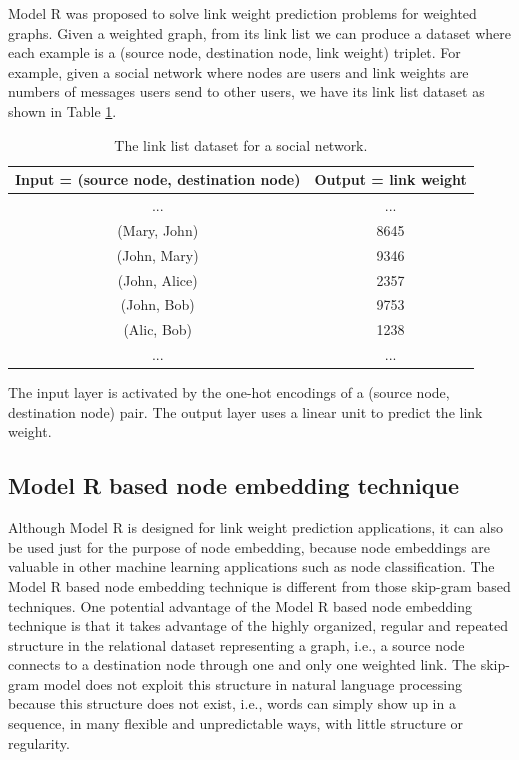 \documentclass[conference]{IEEEtran}
\begin{document}
Model R was proposed to solve link weight prediction problems for weighted graphs.
Given a weighted graph, from its link list we can produce a dataset where each example is a (source node, destination node, link weight) triplet.
For example, given a social network where nodes are users and link weights are numbers of messages users send to other users, we have its link list dataset as shown in Table \ref{tab:link-list-dataset}.
\begin{table}[!ht]
	\centering
	\caption{The link list dataset for a social network.}
	\begin{tabular}{cc}  \hline \rowcolor{blue!30}
		Input = (source node, destination node) & Output = link weight \\ \hline
		...                        & ... \\ \hline
		(Mary, John) & 8645 \\ \hline
		(John, Mary) & 9346 \\ \hline
		(John, Alice) & 2357 \\ \hline
		(John, Bob) & 9753 \\ \hline
		(Alic, Bob) & 1238 \\ \hline
		...                        & ... \\ \hline
	\end{tabular}
	\label{tab:link-list-dataset}
\end{table}
The input layer is activated by the one-hot encodings of a (source node, destination node) pair. The output layer uses a linear unit to predict the link weight.

\subsection{Model R based node embedding technique}
Although Model R is designed for link weight prediction applications,
it can also be used just for the purpose of node embedding, because node embeddings are valuable in other machine learning applications such as node classification.
The Model R based node embedding technique is different from those skip-gram based techniques.
One potential advantage of the Model R based node embedding technique is that it takes advantage of the highly organized, regular and repeated structure in the relational dataset representing a graph, i.e., a source node connects to a destination node through one and only one weighted link.
The skip-gram model does not exploit this structure in natural language processing because this structure does not exist, i.e., words can simply show up in a sequence, in many flexible and unpredictable ways, with little structure or regularity.
\end{document}
